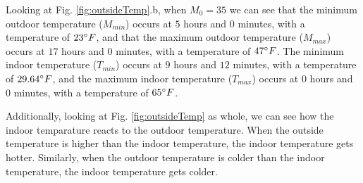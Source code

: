 \documentclass[titlepage]{article}
\begin{document}
Looking at Fig. \ref{fig:outsideTemp}.b, when $M_0=35$ we can see that the minimum outdoor temperature ($M_{min}$)  occurs at $5$ hours 
and $0$ minutes, with a temperature of $23\degree F$, and that the maximum outdoor temperature ($M_{max}$) occurs at $17$ hours and $0$ minutes, with a temperature of $47\degree F$.
The minimum indoor temperature ($T_{min}$) occurs at $9$ hours and $12$ minutes, with a temperature of $29.64\degree F$, and
the maximum indoor temperature ($T_{max}$) occurs at $0$ hours and $0$ minutes, with a temperature of $65\degree F$.

Additionally, looking at Fig. \ref{fig:outsideTemp} as whole, we can see how the indoor temparature reacts to the outdoor temperature. When %
the outside temperature is higher than the indoor temperature, the indoor temperature gets
hotter. Similarly, when %
the outdoor temperature is colder than the indoor temperature, the indoor temperature gets
colder.


\end{document}
